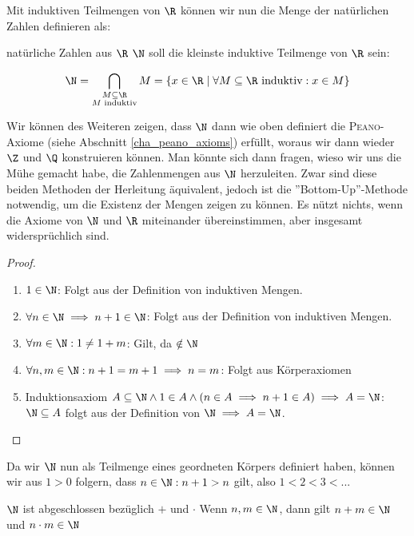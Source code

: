 Mit induktiven Teilmengen von $\R$ können wir nun die Menge der natürlichen Zahlen definieren als:

\begin{definition}{natürliche Zahlen aus $\R$}{}
$\N$ soll die kleinste induktive Teilmenge von $\R$ sein:

$$\N = \bigcap_{\substack{M \subseteq \R \\ M \text{ induktiv}}} M = \{x \in \R \mid \forall M \subseteq \R \text{ induktiv}: x \in M\}$$
\end{definition}

Wir können des Weiteren zeigen, dass $\N$ dann wie oben definiert die \textsc{Peano}-Axiome (siehe Abschnitt \ref{cha_peano_axioms}) erfüllt, woraus wir dann wieder $\Z$ und $\Q$ konstruieren können. Man könnte sich dann fragen, wieso wir uns die Mühe gemacht habe, die Zahlenmengen aus $\N$ herzuleiten. Zwar sind diese beiden Methoden der Herleitung äquivalent, jedoch ist die ''Bottom-Up''-Methode notwendig, um die Existenz der Mengen zeigen zu können. Es nützt nichts, wenn die Axiome von $\N$ und $\R$ miteinander übereinstimmen, aber insgesamt widersprüchlich sind.

\begin{proof}\ 
\begin{enumerate}[label=(\arabic*)]
    \item $1 \in \N$: Folgt aus der Definition von induktiven Mengen.
    \item $\forall n \in \N \implies n + 1 \in \N$: Folgt aus der Definition von induktiven Mengen.
    \item $\forall m \in \N: 1 \neq 1 + m$: Gilt, da $\notin \N$
    \item $\forall n,m \in \N: n+1 = m+1 \implies n = m$: Folgt aus Körperaxiomen
    \item Induktionsaxiom $A \subseteq \N \land 1 \in A \land (n \in A \implies n + 1 \in A) \implies A = \N$: $\N \subseteq A$ folgt aus der Definition von $\N \implies A = \N$.
\end{enumerate}
\end{proof}

\begin{remark}
Da wir $\N$ nun als Teilmenge eines geordneten Körpers definiert haben, können wir aus $1 > 0$ folgern, dass $n \in \N: n + 1 > n$ gilt, also $1 < 2 < 3 < ...$
\end{remark}

\begin{satz}{$\N$ ist abgeschlossen bezüglich $+$ und $\cdot$}{}
Wenn $n,m \in \N$, dann gilt $n + m \in \N$ und $n \cdot m \in \N$
\end{satz}

